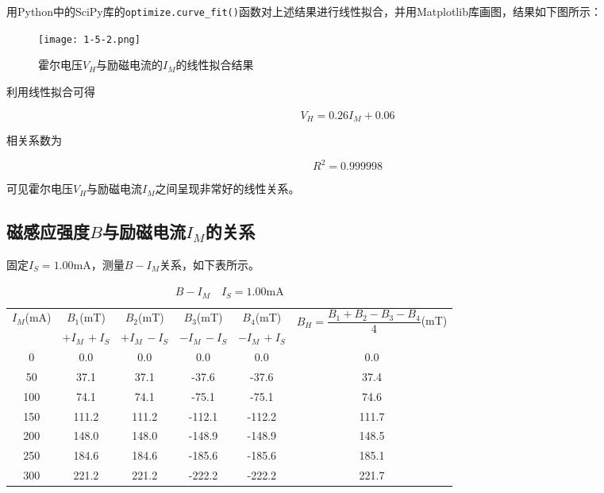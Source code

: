 \documentclass[12pt]{article}
\begin{document}
用Python中的SciPy库的\verb|optimize.curve_fit()|函数对上述结果进行线性拟合，并用Matplotlib库画图，结果如下图所示：

\begin{figure}[htbp]
    \centering
    \texttt{[image: 1-5-2.png]}
    \caption{霍尔电压$V_H$与励磁电流的$I_M$的线性拟合结果}
\end{figure}

利用线性拟合可得

\[
    V_H=0.26I_M+0.06
\]

相关系数为

\[
    R^2=0.999998
\]

可见霍尔电压$V_H$与励磁电流$I_M$之间呈现非常好的线性关系。

\subsection{磁感应强度$B$与励磁电流$I_M$的关系}
固定$I_S=1.00\mathrm{mA}$，测量$B-I_M$关系，如下表所示。

\begin{table}[htbp]
    \centering
    \caption{$B-I_M \quad I_S=1.00\mathrm{mA}$}
    \begin{tabular}{|c|c|c|c|c|c|}
    \hline
    \multirow{2}{*}{$I_M$(mA)} & $B_1$(mT)    & $B_2$(mT)    & $B_3$(mT)    & $B_4$(mT)    & \multirow{2}{*}{$B_H=\dfrac{B_1+B_2-B_3-B_4}{4}$(mT)} \\ \cline{2-5}
                               & $+I_M\,+I_S$ & $+I_M\,-I_S$ & $-I_M\,-I_S$ & $-I_M\,+I_S$ &                                                   \\ \hline
    0                          & 0.0          & 0.0          & 0.0          & 0.0          & 0.0                                               \\ \hline
    50                         & 37.1         & 37.1         & -37.6        & -37.6        & 37.4                                              \\ \hline
    100                        & 74.1         & 74.1         & -75.1        & -75.1        & 74.6                                              \\ \hline
    150                        & 111.2        & 111.2        & -112.1       & -112.2       & 111.7                                             \\ \hline
    200                        & 148.0        & 148.0        & -148.9       & -148.9       & 148.5                                             \\ \hline
    250                        & 184.6        & 184.6        & -185.6       & -185.6       & 185.1                                             \\ \hline
    300                        & 221.2        & 221.2        & -222.2       & -222.2       & 221.7                                             \\ \hline
    \end{tabular}
    \label{tab:B}
\end{table}
\end{document}
